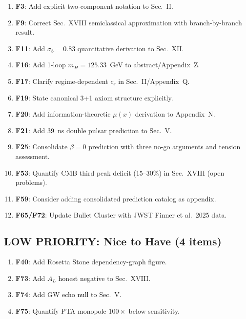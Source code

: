 \documentclass[11pt,a4paper]{article}
\begin{document}
\begin{enumerate}
\item \textbf{F3}: Add explicit two-component notation to Sec.~II.
\item \textbf{F9}: Correct Sec.~XVIII semiclassical approximation with branch-by-branch result.
\item \textbf{F11}: Add $\sigma_8 = 0.83$ quantitative derivation to Sec.~XII.
\item \textbf{F16}: Add 1-loop $m_H = 125.33$~GeV to abstract/Appendix~Z.
\item \textbf{F17}: Clarify regime-dependent $c_s$ in Sec.~II/Appendix~Q.
\item \textbf{F19}: State canonical 3+1 axiom structure explicitly.
\item \textbf{F20}: Add information-theoretic $\mu(x)$ derivation to Appendix~N.
\item \textbf{F21}: Add 39~ns double pulsar prediction to Sec.~V.
\item \textbf{F25}: Consolidate $\beta = 0$ prediction with three no-go arguments and tension assessment.
\item \textbf{F53}: Quantify CMB third peak deficit (15--30\%) in Sec.~XVIII (open problems).
\item \textbf{F59}: Consider adding consolidated prediction catalog as appendix.
\item \textbf{F65/F72}: Update Bullet Cluster with JWST Finner et al.\ 2025 data.
\end{enumerate}

\subsection{LOW PRIORITY: Nice to Have (4 items)}

\begin{enumerate}
\item \textbf{F40}: Add Rosetta Stone dependency-graph figure.
\item \textbf{F73}: Add $A_L$ honest negative to Sec.~XVIII.
\item \textbf{F74}: Add GW echo null to Sec.~V.
\item \textbf{F75}: Quantify PTA monopole $100\times$ below sensitivity.
\end{enumerate}


\appendix
\end{document}
